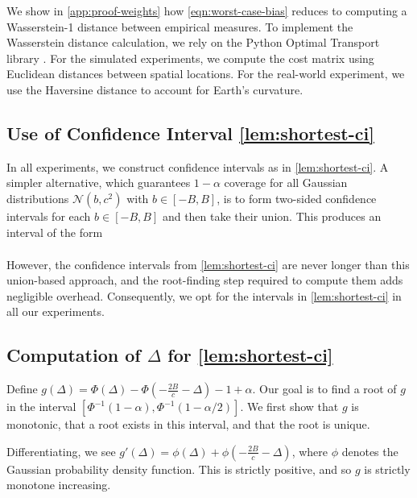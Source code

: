 We show in \cref{app:proof-weights} how \cref{eqn:worst-case-bias} reduces to computing a Wasserstein-1 distance between empirical measures. To implement the Wasserstein distance calculation, we rely on the Python Optimal Transport library \citep{flamary2021pot}. For the simulated experiments, we compute the cost matrix using Euclidean distances between spatial locations. For the real-world experiment, we use the Haversine distance to account for Earth’s curvature.

\subsection{Use of Confidence Interval \cref{lem:shortest-ci}}\label{app:use-of-shortest-ci}

In all experiments, we construct confidence intervals as in \cref{lem:shortest-ci}.
A simpler alternative, which guarantees $1 - \alpha$ coverage for all Gaussian distributions 
$\mathcal{N}(b, c^2)$ with $b \in [-B,B]$, is to form two-sided confidence intervals for each 
$b \in [-B,B]$ and then take their union. This produces an interval of the form
\begin{align*}
   [-B \;-\; c \,\Phi^{-1}\!\bigl(1 - \tfrac{\alpha}{2}\bigr)
  \;\;,\;\;
   B \;+\; c \,\Phi^{-1}\!\bigl(1 - \tfrac{\alpha}{2}\bigr)]
\end{align*}
  
However, the confidence intervals from \cref{lem:shortest-ci} are never longer than this
union-based approach, and the root-finding step required to compute them adds negligible overhead.
Consequently, we opt for the intervals in \cref{lem:shortest-ci} in all our experiments.



\subsection{Computation of $\Delta$ for \cref{lem:shortest-ci}}
\label{app:root-finding}
Define $g(\Delta) = \Phi(\Delta) - \Phi(-\frac{2B}{c}-\Delta) - 1 + \alpha$. Our goal is to find a root of $g$ in the interval $[\Phi^{-1}(1-\alpha), \Phi^{-1}(1-\alpha/2)]$. We first show that $g$ is monotonic, that a root exists in this interval, and that the root is unique.

Differentiating, we see $g'(\Delta) = \phi(\Delta) +\phi(-\frac{2B}{c}-\Delta)$, where $\phi$ denotes the Gaussian probability density function. This is strictly positive, and so $g$ is strictly monotone increasing. 

